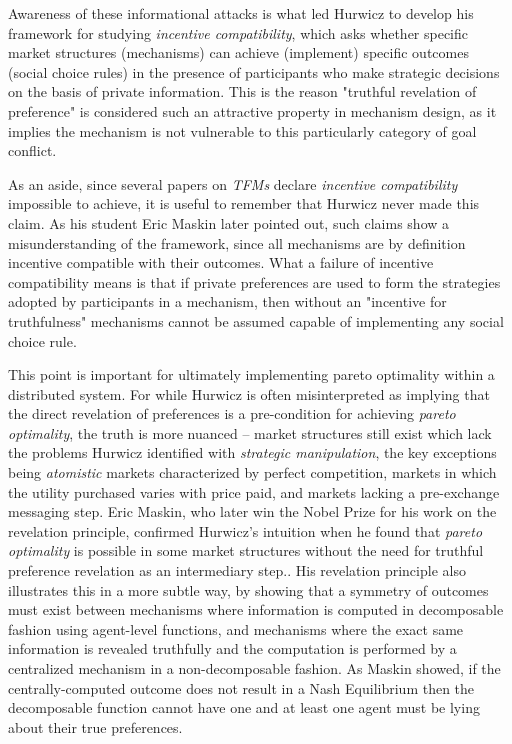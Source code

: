 \documentclass[sigconf,anonymous]{aamas}
\begin{document}
Awareness of these informational attacks is what led Hurwicz to develop his framework for studying \textit{incentive compatibility}, which asks whether specific market structures (mechanisms) can achieve (implement) specific outcomes (social choice rules) in the presence of participants who make strategic decisions on the basis of private information. This is the reason "truthful revelation of preference" is considered such an attractive property in mechanism design, as it implies the mechanism is not vulnerable to this particularly category of goal conflict.

As an aside, since several papers on \textit{TFMs} declare \textit{incentive compatibility} impossible to achieve, it is useful to remember that Hurwicz never made this claim. As his student Eric Maskin later pointed out, such claims show a misunderstanding of the framework, since all mechanisms are by definition incentive compatible with their outcomes. What a failure of incentive compatibility means is that if private preferences are used to form the strategies adopted by participants in a mechanism, then without an "incentive for truthfulness" mechanisms cannot be assumed capable of implementing any social choice rule. 

This point is important for ultimately implementing {pareto optimality} within a distributed system. For while Hurwicz is often misinterpreted as implying that the direct revelation of preferences is a pre-condition for achieving \textit{pareto optimality}, the truth is more nuanced -- market structures still exist which lack the problems Hurwicz identified with \textit{strategic manipulation}, the key exceptions being \textit{atomistic} markets characterized by perfect competition, markets in which the utility purchased varies with price paid, and markets lacking a pre-exchange messaging step. Eric Maskin, who later win the Nobel Prize for his work on the revelation principle, confirmed Hurwicz's intuition when he found that \textit{pareto optimality} is possible in some market structures without the need for truthful preference revelation as an intermediary step.\citet{maskin1999nash}. His revelation principle also illustrates this in a more subtle way, by showing that a symmetry of outcomes must exist between mechanisms where information is computed in decomposable fashion using agent-level functions, and mechanisms where the exact same information is revealed truthfully and the computation is performed by a centralized mechanism in a non-decomposable fashion. As Maskin showed, if the centrally-computed outcome does not result in a Nash Equilibrium then the decomposable function cannot have one and at least one agent must be lying about their true preferences.
\end{document}
